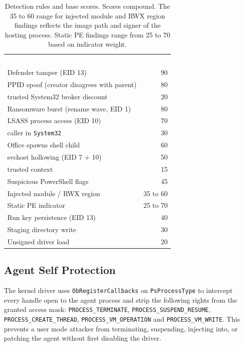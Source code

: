 \documentclass[10pt,twocolumn,letterpaper]{article}
\newcommand{\code}[1]{\texttt{\small #1}}
\newcommand{\Thd}[1]{\textcolor{white}{\sffamily\bfseries #1}}
\newcommand{\headrow}{\rowcolor{TableHead}}
\begin{document}
\begin{table}[t]
\centering
\caption{Detection rules and base scores. Scores compound. The 35 to 60 range for
injected module and RWX region findings reflects the image path and signer of the hosting
process. Static PE findings range from 25 to 70 based on indicator weight.}
\label{tbl:detectors}
\small
\renewcommand{\arraystretch}{1.12}
\begin{tabularx}{\columnwidth}{@{}>{\raggedright\arraybackslash}Xr@{}}
\headrow \Thd{Detection rule} & \Thd{Score} \\
Defender tamper (EID 13)               & 90 \\
PPID spoof (creator disagrees with parent) & 80 \\
\quad trusted System32 broker discount & 20 \\
Ransomware burst (rename wave, EID 1)  & 80 \\
LSASS process access (EID 10)          & 70 \\
\quad caller in \texttt{System32}      & 30 \\
Office spawns shell child              & 60 \\
svchost hollowing (EID 7 + 10)         & 50 \\
\quad trusted context                  & 15 \\
Suspicious PowerShell flags            & 45 \\
Injected module / RWX region           & 35 to 60 \\
Static PE indicator                    & 25 to 70 \\
Run key persistence (EID 13)           & 40 \\
Staging directory write                & 30 \\
Unsigned driver load                   & 20 \\
\bottomrule
\end{tabularx}
\end{table}

\subsection{Agent Self Protection}
\label{sec:safety}

The kernel driver uses \code{ObRegisterCallbacks} on \code{PsProcessType} to intercept
every handle open to the agent process and strip the following rights from the granted
access mask: \code{PROCESS\_TERMINATE}, \code{PROCESS\_SUSPEND\_RESUME},
\code{PROCESS\_CREATE\_THREAD}, \code{PROCESS\_VM\_OPERATION} and \code{PROCESS\_VM\_WRITE}.
This prevents a user mode attacker from terminating, suspending, injecting into, or
patching the agent without first disabling the driver.
\end{document}
